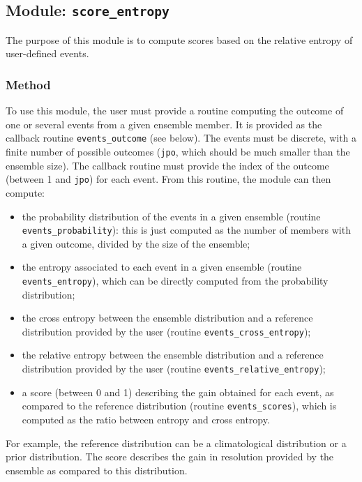 \documentclass[11pt]{article}
\begin{document}
\subsection{Module: {\tt\bf score\_entropy}}

The purpose of this module is to compute
scores based on the relative entropy of user-defined events.

\subsubsection*{Method}

To use this module, the user must provide a routine
computing the outcome of one or several events from a given ensemble member.
It is provided as the callback routine {\tt events\_outcome} (see below).
The events must be discrete, with a finite number of possible outcomes
({\tt jpo}, which should be much smaller than the ensemble size).
The callback routine must provide the index of the outcome (between 1 and {\tt jpo}) for each event.
From this routine, the module can then compute:

\begin{itemize}
\item the probability distribution of the events in a given ensemble (routine {\tt events\_probability}):
this is just computed as the number of members with a given outcome, divided by the size of the ensemble;
\item the entropy associated to each event in a given ensemble (routine {\tt events\_entropy}),
which can be directly computed from the probability distribution;
\item the cross entropy between the ensemble distribution and a reference distribution
provided by the user (routine {\tt events\_cross\_entropy});
\item the relative entropy between the ensemble distribution and a reference distribution
provided by the user (routine {\tt events\_relative\_entropy});
\item a score (between 0 and 1) describing the gain obtained for each event,
as compared to the reference distribution (routine {\tt events\_scores}),
which is computed as the ratio between entropy and cross entropy.
\end{itemize}

\noindent
For example, the reference distribution can be a climatological distribution or a prior distribution.
The score describes the gain in resolution provided by the ensemble as compared to this distribution.
\end{document}
